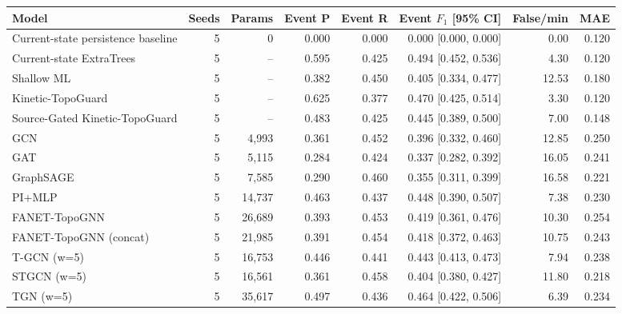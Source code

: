 \begin{tabular}{lrrrrrrr}
\toprule
Model & Seeds & Params & Event P & Event R & Event $F_1$ [95\% CI] & False/min & MAE \\
\midrule
Current-state persistence baseline & 5 & 0 & 0.000 & 0.000 & 0.000 [0.000, 0.000] & 0.00 & 0.120 \\
Current-state ExtraTrees & 5 & -- & 0.595 & 0.425 & 0.494 [0.452, 0.536] & 4.30 & 0.120 \\
Shallow ML & 5 & -- & 0.382 & 0.450 & 0.405 [0.334, 0.477] & 12.53 & 0.180 \\
Kinetic-TopoGuard & 5 & -- & 0.625 & 0.377 & 0.470 [0.425, 0.514] & 3.30 & 0.120 \\
Source-Gated Kinetic-TopoGuard & 5 & -- & 0.483 & 0.425 & 0.445 [0.389, 0.500] & 7.00 & 0.148 \\
GCN & 5 & 4,993 & 0.361 & 0.452 & 0.396 [0.332, 0.460] & 12.85 & 0.250 \\
GAT & 5 & 5,115 & 0.284 & 0.424 & 0.337 [0.282, 0.392] & 16.05 & 0.241 \\
GraphSAGE & 5 & 7,585 & 0.290 & 0.460 & 0.355 [0.311, 0.399] & 16.58 & 0.221 \\
PI+MLP & 5 & 14,737 & 0.463 & 0.437 & 0.448 [0.390, 0.507] & 7.38 & 0.230 \\
FANET-TopoGNN & 5 & 26,689 & 0.393 & 0.453 & 0.419 [0.361, 0.476] & 10.30 & 0.254 \\
FANET-TopoGNN (concat) & 5 & 21,985 & 0.391 & 0.454 & 0.418 [0.372, 0.463] & 10.75 & 0.243 \\
T-GCN (w=5) & 5 & 16,753 & 0.446 & 0.441 & 0.443 [0.413, 0.473] & 7.94 & 0.238 \\
STGCN (w=5) & 5 & 16,561 & 0.361 & 0.458 & 0.404 [0.380, 0.427] & 11.80 & 0.218 \\
TGN (w=5) & 5 & 35,617 & 0.497 & 0.436 & 0.464 [0.422, 0.506] & 6.39 & 0.234 \\
\bottomrule
\end{tabular}
